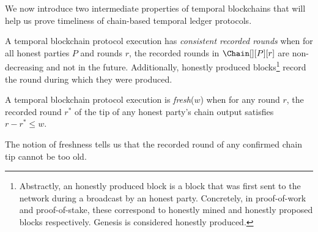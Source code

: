 We now introduce two intermediate properties of temporal blockchains
that will help us prove timeliness of
chain-based temporal ledger protocols.

\begin{definition}
  A temporal blockchain protocol execution has \emph{consistent recorded rounds}
  when for all honest parties $P$ and rounds $r$,
  the recorded rounds in $\Chain[][P][r]$ are non-decreasing and not
  in the future.
  Additionally, honestly produced blocks\footnote{
    Abstractly, an honestly produced block is a block that was first
    sent to the network during a broadcast by an honest party. Concretely, in proof-of-work
    and proof-of-stake, these correspond to honestly mined and honestly
    proposed blocks respectively. Genesis is considered honestly produced.
  } record the round during which
  they were produced.
\end{definition}

\begin{definition}[Freshness] \label{def:tip-freshness}
  A temporal blockchain protocol execution is \emph{fresh}($w$) when for
  any round $r$, the recorded round
  $r^*$ of the tip of any honest party's chain output
  satisfies $r - r^* \leq w$.
\end{definition}

The notion of freshness tells us that the recorded round
of any confirmed chain tip cannot be too old.

